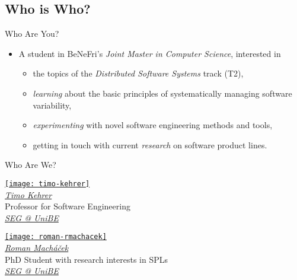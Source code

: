 \subsection{Who is Who?}

\begin{frame}{\myframetitle}
	\begin{fancycolumns}
		\begin{example}{Who Are You?}
			\begin{itemize}
				\item A student in BeNeFri's \emph{Joint Master in Computer Science}, interested in
				\begin{itemize}
					\item the topics of the \emph{Distributed Software Systems} track (T2),
					\item \emph{learning} about the basic principles of systematically managing software variability,
					\item \emph{experimenting} with novel software engineering methods and tools,
					\item getting in touch with current \emph{research} on software product lines.
				\end{itemize}
			\end{itemize}
		\end{example}
	\nextcolumn
		\begin{note}{Who Are We?}
			\centering
			\parbox{0.45\linewidth}{
				\centering
				\href{https://seg.inf.unibe.ch/people/timo/}{\texttt{[image: timo-kehrer]}}\\[.5ex]
				\href{https://seg.inf.unibe.ch/people/timo/}{\emph{Timo Kehrer}}\\[.5ex]
				\small Professor for Software Engineering \\[.5ex]
				\href{https://seg.inf.unibe.ch/}{\small \emph{SEG @ UniBE}}
			}
			\parbox{0.45\linewidth}{
				\centering
				\href{https://seg.inf.unibe.ch/people/}{\texttt{[image: roman-rmachacek]}}\\[.5ex]
				\href{https://seg.inf.unibe.ch/people/}{\emph{Roman Macháček}}\\[.5ex]
				\small PhD Student with research interests in SPLs \\[.5ex]
				\href{https://seg.inf.unibe.ch/}{\small \emph{SEG @ UniBE}}
			}
		\end{note}
	\end{fancycolumns}
\end{frame}

